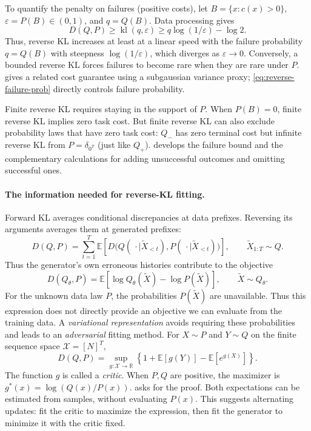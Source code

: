 \documentclass[11pt,twoside]{article}
\newcommand{\R}{\mathbb R}
\newcommand{\E}{\mathbb E}
\newcommand{\KL}{D}
\theoremstyle{definition}
\theoremstyle{remark}
\begin{document}
To quantify the penalty on failures (positive costs), let \(B=\{x:c(x)>0\}\),
\(\varepsilon=P(B)\in(0,1)\), and \(q=Q(B)\). Data processing gives
\begin{equation}
 \KL(Q,P)\ge\operatorname{kl}(q,\varepsilon)
 \ge q\log(1/\varepsilon)-\log 2.
 \label{eq:reverse-failure-prob}
\end{equation}
Thus, reverse KL increases
at least at a linear speed with the failure probability $q=Q(B)$
with steepness $\log(1/\varepsilon)$, which diverges as $\varepsilon\to 0$.
Conversely, a bounded reverse KL forces failures
to become rare when they are rare under \(P\).
 gives a related cost guarantee using a subgaussian
variance proxy; \cref{eq:reverse-failure-prob} directly controls failure
probability.

Finite reverse KL requires staying in the support of \(P\). When $P(B)=0$,
finite reverse KL implies zero task cost.
But finite reverse KL can also exclude probability laws that have zero task cost:
\(Q_-\) has zero terminal cost but infinite reverse KL from
\(P=\delta_{0^T}\) (just like \(Q_+\)).
 develops the failure bound and the complementary
calculations for adding unsuccessful outcomes and omitting successful ones.

\paragraph{The information needed for reverse-KL fitting.}
Forward KL averages conditional discrepancies at data prefixes.
Reversing its arguments averages them at generated prefixes:
\begin{equation}
 \KL(Q, P)
 =\sum_{t=1}^T\E\!\left[
 \KL\bigl(Q(\,\cdot\mid\widetilde X_{<t})
       , P(\,\cdot\mid\widetilde X_{<t})\bigr)\right],
 \qquad \widetilde X_{1:T}\sim Q.
 \label{eq:reverse-chain}
\end{equation}
Thus the generator's own erroneous histories contribute to the objective
\begin{equation}
 \KL(Q_\theta, P)
 =\E[\log Q_\theta(\widetilde X)-\log P(\widetilde X)],
 \qquad \widetilde X\sim Q_\theta.
 \label{eq:reverse-objective}
\end{equation}
For the unknown data law \(P\), the probabilities \(P(\widetilde X)\)
are unavailable. Thus this expression does not directly provide an
objective we can evaluate from the training data.
A \emph{variational representation} avoids requiring these probabilities
and leads to an \emph{adversarial} fitting method.
For \(X\sim P\) and \(Y\sim Q\) on the finite sequence space
\(\mathcal X=[N]^T\),
\begin{equation}
 \KL(Q,P)
 =\sup_{g:\mathcal X\to\R}
 \left\{1+\E[g(Y)]-\E[e^{g(X)}]\right\}.
 \label{eq:reverse-adversarial}
\end{equation}
The function \(g\) is called a \emph{critic}. When \(P,Q\) are positive,
the maximizer is \(g^*(x)=\log(Q(x)/P(x))\).
 asks for the proof.
Both expectations can be estimated from samples, without evaluating
\(P(x)\). This suggests alternating updates: fit the critic to maximize
the expression, then fit the generator to minimize it with the critic
fixed.
\end{document}
